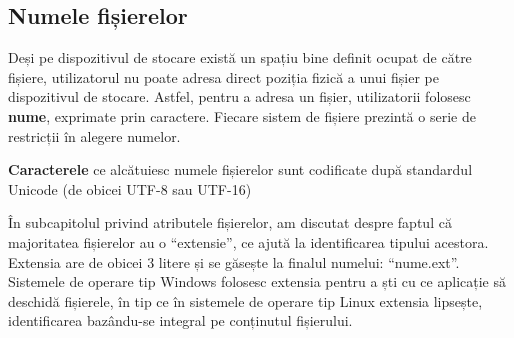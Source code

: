 \subsection{Numele fișierelor}
\label{sec:file-system-fs-names}

Deși pe dispozitivul de stocare există un spațiu bine definit ocupat de către
fișiere, utilizatorul nu poate adresa direct poziția fizică a unui fișier pe
dispozitivul de stocare. Astfel, pentru a adresa un fișier, utilizatorii
folosesc \textbf{nume}, exprimate prin caractere. Fiecare sistem de fișiere
prezintă o serie de restricții în alegere numelor.

\textbf{Caracterele} ce alcătuiesc numele fișierelor sunt codificate după
standardul Unicode (de obicei UTF-8 sau UTF-16)

În subcapitolul privind atributele fișierelor, am discutat despre faptul că
majoritatea fișierelor au o “extensie”, ce ajută la identificarea tipului
acestora. Extensia are de obicei 3 litere și se găsește la finalul numelui:
“nume.ext”. Sistemele de operare tip Windows folosesc extensia pentru a ști cu
ce aplicație să deschidă fișierele, în tip ce în sistemele de operare tip Linux
extensia lipsește, identificarea bazându-se integral pe conținutul fișierului.

